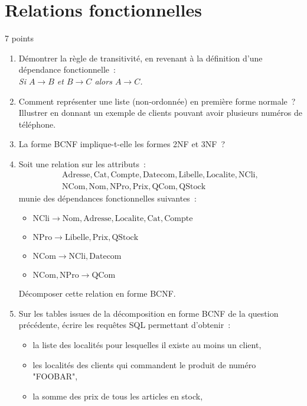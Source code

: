 \documentclass[a4paper,11pt]{article}
\begin{document}
\section{Relations fonctionnelles}{7 points}
\begin{enumerate}
  \item Démontrer la règle de transitivité, en revenant à la définition d'une dépendance fonctionnelle~:\\
  \emph{Si $A \rightarrow B$ et $B \rightarrow C$ alors $A \rightarrow C$.}
  \item Comment représenter une liste (non-ordonnée) en première forme normale~? Illustrer en donnant un exemple de clients pouvant avoir plusieurs numéros de téléphone.
  \item La forme BCNF implique-t-elle les formes 2NF et 3NF~?
  \item
    Soit une relation sur les attributs~:
    \[
      \begin{array}{l}
        \mathrm{Adresse}, \mathrm{Cat}, \mathrm{Compte}, \mathrm{Datecom}, \mathrm{Libelle}, \mathrm{Localite}, \mathrm{NCli},\\
        \mathrm{NCom}, \mathrm{Nom}, \mathrm{NPro}, \mathrm{Prix}, \mathrm{QCom}, \mathrm{QStock}
      \end{array}
    \]
    munie des dépendances fonctionnelles suivantes~:
    \begin{itemize}
      \item $\mathrm{NCli} \rightarrow \mathrm{Nom}, \mathrm{Adresse}, \mathrm{Localite}, \mathrm{Cat}, \mathrm{Compte}$
      \item $\mathrm{NPro} \rightarrow \mathrm{Libelle}, \mathrm{Prix}, \mathrm{QStock}$
      \item $\mathrm{NCom} \rightarrow \mathrm{NCli}, \mathrm{Datecom}$
      \item $\mathrm{NCom}, \mathrm{NPro} \rightarrow \mathrm{QCom}$
    \end{itemize}
    Décomposer cette relation en forme BCNF.
  \item Sur les tables issues de la décomposition en forme BCNF de la question précédente, écrire les requêtes SQL permettant d'obtenir~:
    \begin{itemize}
      \item la liste des localités pour lesquelles il existe au moins un client,
      \item les localités des clients qui commandent le produit de numéro "FOOBAR",
      \item la somme des prix de tous les articles en stock,

\end{itemize}
\end{enumerate}
\end{document}
